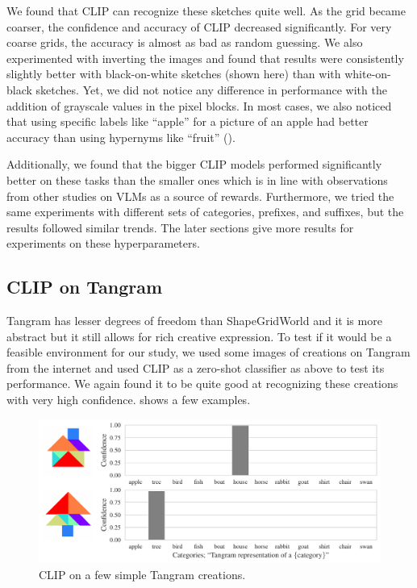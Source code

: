 We found that CLIP can recognize these sketches quite well.
As the grid became coarser, the confidence and accuracy of CLIP decreased significantly.
For very coarse grids, the accuracy is almost as bad as random guessing.
We also experimented with inverting the images and found that results were consistently slightly better with black-on-white sketches (shown here) than with white-on-black sketches.
Yet, we did not notice any difference in performance with the addition of grayscale values in the pixel blocks.
In most cases, we also noticed that using specific labels like ``apple'' for a picture of an apple had better accuracy than using hypernyms like ``fruit'' ().

Additionally, we found that the bigger CLIP models performed significantly better on these tasks than the smaller ones which is in line with observations from other studies on VLMs as a source of rewards.
Furthermore, we tried the same experiments with different sets of categories, prefixes, and suffixes, but the results followed similar trends.
The later sections give more results for experiments on these hyperparameters.


\subsection{CLIP on Tangram}
\label{sec:clip-tangram}

Tangram has lesser degrees of freedom than ShapeGridWorld and it is more abstract but it still allows for rich creative expression.
To test if it would be a feasible environment for our study, we used some images of creations on Tangram from the internet and used CLIP as a zero-shot classifier as above to test its performance.
We again found it to be quite good at recognizing these creations with very high confidence.
 shows a few examples.
\begin{figure}[h]
    \centering
    \includegraphics[width=\textwidth]{images/tangram_comparison_10.pdf}
    \caption{CLIP on a few simple Tangram creations.}
    \label{fig:clip-tangram}
\end{figure}

